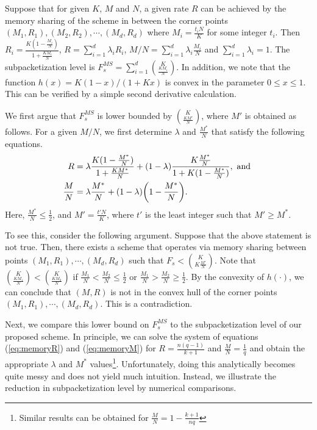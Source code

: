 \documentclass[journal,twocolumn]{IEEEtran}
\theoremstyle{definition}
\newcommand{\aditya}[1]{\marginpar{+}{\bf Aditya's remark}: {\em #1}}
\begin{document}
Suppose that for given $K$, $M$ and $N$, a given rate $R$ can be achieved  by the memory sharing of the scheme in \cite{maddahN14} between the corner points $(M_1, R_1), (M_2,R_2),\cdots, (M_d,R_d)$ where $M_i=\frac{t_iN}{K}$ for some integer $t_i$. Then $R_i=\frac{K(1-\frac{M_i}{N})}{1+\frac{KM_i}{N}}$, $R=\sum_{i=1}^d \lambda_i R_i$, $M/N = \sum_{i=1}^d \lambda_i \frac{M_i}{N}$ and $\sum_{i=1}^d \lambda_i=1$. The subpacketization level is $F_s^{MS}=\sum_{i=1}^d\binom{K}{\frac{KM_i}{N}}$. In addition, we note that the function $h(x) = K(1 - x)/(1 + Kx)$ is convex in the parameter $0 \leq x \leq 1$. This can be verified by a simple second derivative calculation.

We first argue that $F_s^{MS}$ is lower bounded by $\binom{K}{\frac{KM'}{N}}$, where $M'$ is obtained as follows. For a given $M/N$, we first determine $\lambda$ and $\frac{M^*}{N}$ that satisfy the following equations.
\begin{align}
R &=\lambda\frac{K(1-\frac{M^*}{N})}{1+\frac{KM^*}{N}}+(1-\lambda)\frac{K\frac{M^*}{N}}{1+K(1-\frac{M^*}{N})}, \text{~and~} \label{eq:memoryR}\\
\frac{M}{N} &=\lambda \frac{M^*}{N}+(1-\lambda)\bigg{(} 1-\frac{M^*}{N} \bigg{)}. \label{eq:memoryM}
\end{align}
Here, $\frac{M^*}{N}\le \frac{1}{2}$, and $M'=\frac{t'N}{K}$, where $t'$ is the least integer such that $M'\ge M^*$.

To see this, consider the following argument. Suppose that the above statement is not true. Then, there exists a scheme that operates via memory sharing between points $(M_1,R_1), \cdots, (M_d,R_d)$ such that $F_s<\binom{K}{K\frac{M'}{N}}$. Note that $\binom{K}{\frac{K M_1}{N}}<\binom{K}{\frac{K M_2}{N}}$ if $\frac{M_1}{N}<\frac{M_2}{N}\le \frac{1}{2}$ or $\frac{M_1}{N}>\frac{M_2}{N}\ge \frac{1}{2}$. By the convexity of $h(\cdot)$, we can conclude that $(M, R)$ is not in the convex hull of the corner points $(M_1,R_1), \cdots, (M_d,R_d)$. This is a contradiction.


Next, we compare this lower bound on $F_s^{MS}$ to the subpacketization level of our proposed scheme. In principle, we can solve the system of equations (\ref{eq:memoryR}) and (\ref{eq:memoryM}) for $R = \frac{n(q-1)}{k+1}$ and $\frac{M}{N} = \frac{1}{q}$ and obtain the appropriate $\lambda$ and $M^*$ values\footnote{Similar results can be obtained for $\frac{M}{N}=1-\frac{k+1}{nq}$}. Unfortunately, doing this analytically becomes quite messy and does not yield much intuition. Instead, we illustrate the reduction in subpacketization level by numerical comparisons.
\end{document}
